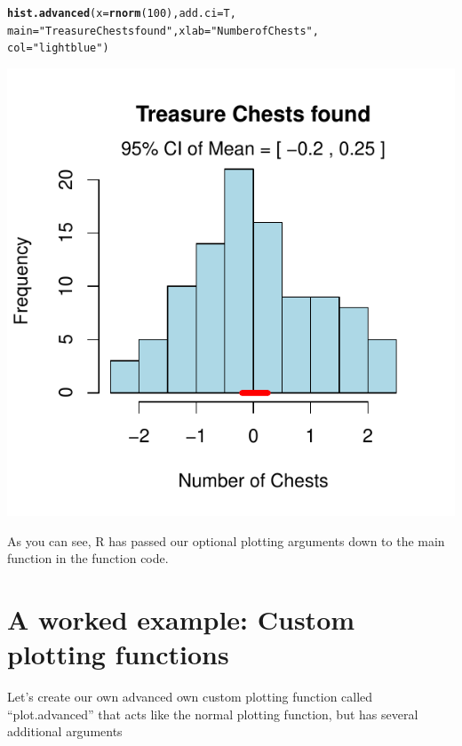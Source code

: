 \documentclass{tufte-book}\usepackage[]{graphicx}\usepackage[]{color}
\makeatletter
\def\maxwidth{ %
  \ifdim\Gin@nat@width>\linewidth
    \linewidth
  \else
    \Gin@nat@width
  \fi
}
\newcommand{\hlnum}[1]{\textcolor[rgb]{0.686,0.059,0.569}{#1}}%
\newcommand{\hlstr}[1]{\textcolor[rgb]{0.192,0.494,0.8}{#1}}%
\newcommand{\hlstd}[1]{\textcolor[rgb]{0.345,0.345,0.345}{#1}}%
\newcommand{\hlkwc}[1]{\textcolor[rgb]{0.333,0.667,0.333}{#1}}%
\newcommand{\hlkwd}[1]{\textcolor[rgb]{0.737,0.353,0.396}{\textbf{#1}}}%
\newenvironment{kframe}{%
 \def\at@end@of@kframe{}%
 \ifinner\ifhmode%
  \def\at@end@of@kframe{\end{minipage}}%
  \begin{minipage}{\columnwidth}%
 \fi\fi%
 \def\FrameCommand##1{\hskip\@totalleftmargin \hskip-\fboxsep
 \colorbox{shadecolor}{##1}\hskip-\fboxsep
     \hskip-\linewidth \hskip-\@totalleftmargin \hskip\columnwidth}%
 \MakeFramed {\advance\hsize-\width
   \@totalleftmargin\z@ \linewidth\hsize
   \@setminipage}}%
 {\par\unskip\endMakeFramed%
 \at@end@of@kframe}
\newenvironment{knitrout}{}{} %
\makeatother
\begin{document}
\begin{footnotesize}
\begin{knitrout}
\color{fgcolor}\begin{kframe}
\begin{alltt}
\hlkwd{hist.advanced}\hlstd{(}\hlkwc{x} \hlstd{=} \hlkwd{rnorm}\hlstd{(}\hlnum{100}\hlstd{),} \hlkwc{add.ci} \hlstd{= T,}
              \hlkwc{main} \hlstd{=} \hlstr{"Treasure Chests found"}\hlstd{,} \hlkwc{xlab} \hlstd{=} \hlstr{"Number of Chests"}\hlstd{,}
              \hlkwc{col} \hlstd{=} \hlstr{"lightblue"}\hlstd{)}
\end{alltt}
\end{kframe}
\includegraphics[width=\maxwidth]{figure/unnamed-chunk-283-1} 

\end{knitrout}

As you can see, R has passed our optional plotting arguments down to the main  function in the function code. 

\section{A worked example: Custom plotting functions}

Let's create our own advanced own custom plotting function called ``plot.advanced'' that acts like the normal plotting function, but has several additional arguments


\end{footnotesize}
\end{document}
